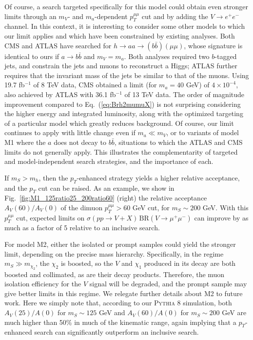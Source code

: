 \documentclass[aps,prd,twocolumn,superscriptaddress,preprintnumbers,nofootinbib,longbibliography,floatfix]{revtex4-1}
\newcommand{\nameofsearch}{$p_T$-enhanced }
\newcommand{\ptmm}{p_T^{\mu\mu}}
\newcommand{\BR}{\text{BR}}
\DeclareRobustCommand{\Fig}[1]{Fig.~\ref{#1}}
\DeclareRobustCommand{\Eq}[1]{Eq.~(\ref{#1})}
\begin{document}
Of course, a search targeted specifically for this model could obtain even stronger limits through an $m_V$- and $m_a$-dependent $\ptmm$ cut and by adding the $V\to e^+e^-$ channel.
%
In this context, it is interesting to consider some other models to which our limit applies and which have been constrained by existing analyses.
%
Both CMS \cite{Khachatryan:2017mnf} and ATLAS \cite{Aaboud:2018esj} have searched for $h\to a a\to (b\bar b) (\mu\mu)$, whose signature is identical to ours if $a\to b\bar b$ and $m_V=m_a$.  Both analyses required two $b$-tagged jets, and constrain the jets and muons to reconstruct a Higgs; ATLAS further requires that the invariant mass of the jets be similar to that of the muons. 
%
Using 19.7 fb$^{-1}$ of 8 TeV data, CMS obtained a limit (for $m_a = 40$ GeV) of $4\times 10^{-4}$, also achieved by ATLAS with 36.1 fb$^{-1}$ of  13 TeV data.
%
The order of magnitude improvement compared to \Eq{eq:Brh2mumuX} is not surprising considering the higher energy and integrated luminosity, along with the optimized targeting of a particular model which greatly reduces background.  
%
Of course, our limit continues to apply with little change even if $m_a\ll m_V$, or to variants of model M1 where the $a$ does not decay to $b\bar b$, situations to which the ATLAS and CMS limits do not generally apply.  
%
This illustrates the complementarity of targeted and model-independent search strategies, and the importance of each.


If $m_S>m_h$, then the \nameofsearch strategy yields a higher relative acceptance, and the $p_T$ cut can be raised.
%
As an example, we show in \Fig{fig:M1_125ratio25_200ratio60} (right) the relative acceptance $A_V(60)/A_V(0)$ of the dimuon $\ptmm>60$ GeV cut, for $m_S\sim 200$ GeV.  
%
With this $\ptmm$ cut, expected limits on $\sigma(pp\to V+X) \, \BR (V\to\mu^+\mu^-)$  can improve by as much as a factor of 5 relative to an inclusive search.


For model M2, either the isolated or prompt samples could yield the stronger limit, depending on the precise mass hierarchy.
%
Specifically, in the regime $m_S\gg m_{\chi_2}$, the $\chi_2$ is boosted, so the $V$ and $\chi_1$ produced in its decay are both boosted and collimated, as are their decay products.
%
Therefore, the muon isolation efficiency for the $V$ signal will be degraded, and the prompt sample may give better limits in this regime.
%
We relegate further details about M2 to future work.
%
Here we simply note that, according to our \textsc{Pythia} 8 simulation, both $A_V(25)/A(0)$ for $m_S\sim 125$ GeV and $A_V(60)/A(0)$ for $m_S\sim 200$ GeV are much higher than 50\% in much of the kinematic range, again implying that a \nameofsearch search can significantly outperform an inclusive search.
%
\end{document}
